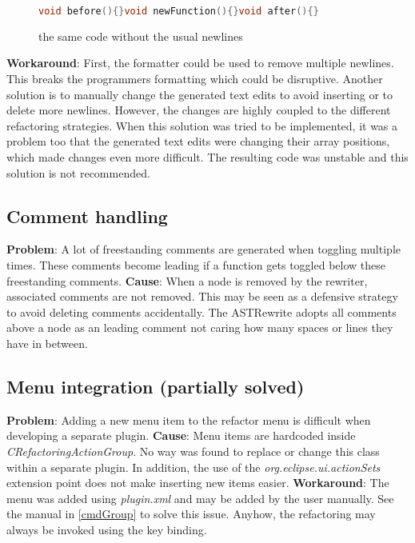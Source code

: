 \begin{figure}[h]
\begin{lstlisting}[language=C++]
void before(){}void newFunction(){}void after(){}
\end{lstlisting}
\setlength{\abovecaptionskip}{-20pt}
\caption{the same code without the usual newlines}
\label{commentB}
\end{figure}

\textbf{Workaround}: First, the formatter could be used to remove multiple 
newlines. This breaks the programmers formatting which could be disruptive. 
Another solution is to manually change the generated text edits to avoid 
inserting or to delete more newlines. However, the changes are highly coupled to 
the different refactoring strategies. When this solution was tried to be 
implemented, it was a problem too that the generated text edits were changing 
their array positions, which made changes even more difficult. The resulting 
code was unstable and this solution is not recommended. 

\subsection{Comment handling}
\textbf{Problem}: A lot of freestanding comments are generated when
toggling multiple times. These comments become leading if a function gets
toggled below these freestanding comments.
\textbf{Cause}: When a node is removed by the rewriter, associated comments are 
not removed. This may be seen as a defensive strategy to avoid deleting comments 
accidentally. The ASTRewrite adopts all comments above a node as an leading
comment not caring how many spaces or lines they have in between.

\subsection{Menu integration (partially solved)}
\textbf{Problem}: Adding a new menu item to the refactor menu is difficult when 
developing a separate plugin.
\textbf{Cause}: Menu items are hardcoded inside 
\textit{CRefactoringActionGroup}. No way was found to replace or change this 
class within a separate plugin. In addition, the use of the 
\textit{org.eclipse.ui.actionSets} extension point does not make inserting new 
items easier.
\textbf{Workaround}: The menu was added using \textit{plugin.xml} and may be added 
by the user manually. See the manual in \ref{cmdGroup} to solve this issue. 
Anyhow, the refactoring may always be invoked using the key binding. 

